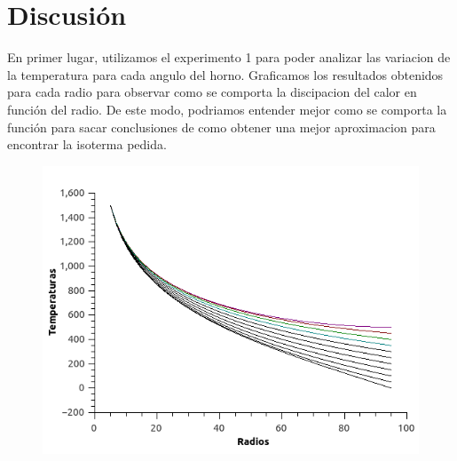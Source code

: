 \section{Discusión}
En primer lugar, utilizamos el experimento 1 para poder analizar las variacion de la temperatura para cada angulo del horno. Graficamos los resultados obtenidos para cada radio para observar como se comporta la discipacion del calor en función del radio. De este modo, podriamos entender mejor como se comporta la función para sacar conclusiones de como obtener una mejor aproximacion para encontrar la isoterma pedida.

\begin{figure}[h]
  \center
  \includegraphics[scale=0.8]{imagenes/avanceTemperaturas.png}
  \label{fig:avanceTemps}
\end{figure}

